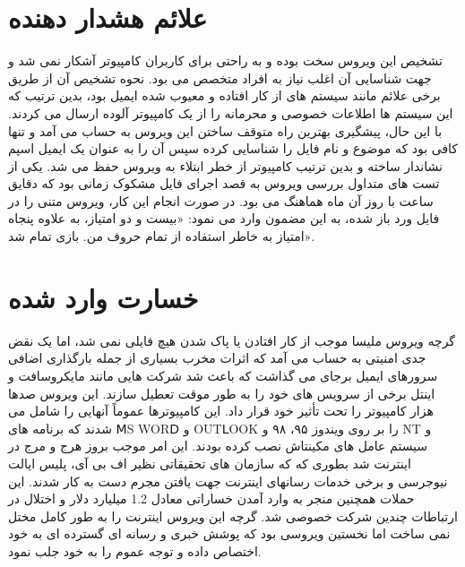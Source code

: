 \section{علائم هشدار دهنده}
تشخیص این ویروس سخت بوده و به راحتی برای کاربران کامپیوتر آشکار نمی شد و جهت شناسایی آن
اغلب نیاز به افراد متخصص می بود. نحوه تشخیص آن از طریق برخی علائم مانند سیستم های از کار
افتاده و معیوب شده ایمیل بود، بدین ترتیب که این سیستم ها اطلاعات خصوصی و محرمانه را از یک
کامپیوتر آلوده ارسال می کردند. با این حال، پیشگیری بهترین راه متوقف ساختن این ویروس به حساب
می آمد و تنها کافی بود که موضوع و نام فایل را شناسایی کرده سپس آن را به عنوان یک ایمیل اسپم
نشاندار ساخته و بدین ترتیب کامپیوتر از خطر ابتلاء به ویروس حفظ می شد. یکی از تست های متداول
بررسی ویروس به قصد اجرای فایل مشکوک زمانی بود که دقایق ساعت با روز آن ماه هماهنگ می بود.
در صورت انجام این کار، ویروس متنی را در فایل ورد باز شده، به این مضمون وارد می نمود: «بیست و
دو امتیاز، به علاوه پنجاه امتیاز به خاطر استفاده از تمام حروف من. بازی تمام شد».

\section{خسارت وارد شده}
گرچه ویروس ملیسا موجب از کار افتادن یا پاک شدن هیچ فایلی نمی شد، اما یک نقض جدی امنیتی به
حساب می آمد که اثرات مخرب بسیاری از جمله بارگذاری اضافی سرورهای ایمیل برجای می گذاشت که
باعث شد شرکت هایی مانند مایکروسافت و اینتل برخی از سرویس های خود را به طور موقت تعطیل
سازند. این ویروس صدها هزار کامپیوتر را تحت تأثیر خود قرار داد. این کامپیوترها عموماً آنهایی را
شامل می شدند که برنامه های ⅯS WORⅮ و OUTⅬOOK را بر روی ویندوز ۹۵، ۹۸ و NT و
سیستم عامل های مکینتاش نصب کرده بودند. این امر موجب بروز هرج و مرج در اینترنت شد بطوری که
که سازمان های تحقیقاتی نظیر اف بی آی، پلیس ایالت نیوجرسی و برخی خدمات رسانهای اینترنت جهت
یافتن مجرم دست به کار شدند. این حملات همچنین منجر به وارد آمدن خساراتی معادل 1.2 میلیارد
دلار و اختلال در ارتباطات چندین شرکت خصوصی شد. گرچه این ویروس اینترنت را به طور کامل
مختل نمی ساخت اما نخستین ویروسی بود که پوشش خبری و رسانه ای گسترده ای به خود اختصاص داده
و توجه عموم را به خود جلب نمود.

